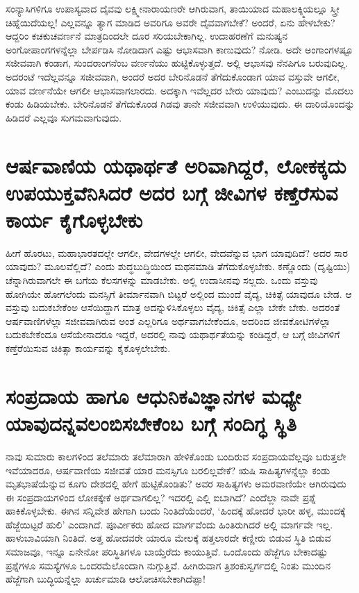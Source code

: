 ಸಂನ್ಯಾಸಿಗಳಿಗೂ ಉಪಾಸ್ಯವಾದ ದೈವವು ಲಕ್ಷ್ಮೀನಾರಾಯಣರೇ ಆಗಿರುವಾಗ, ತಾಯಿಯಾದ ಮಹಾಲಕ್ಶ್ಮಿಯಲ್ಲೂ ಸ್ತ್ರೀ ಚಿಹ್ನೆಯಿದೆಯಲ್ಲ! ಎಲ್ಲವನ್ನೂ ತ್ಯಾಗ ಮಾಡಿದ ಅವರಿಗೂ ಅವರೇ ದೈವವಾಗಬೇಕೆ? ಅಂದರೆ, ಏನು ಹೇಳಬೇಕು? ಆದ್ದರಿಂ ಕಚಕುಚವರ್ಣನೆ ಮಾತ್ರದಿಂದಲೇ ದೂರ ಸರಿಯಬೇಕಾಗಿಲ್ಲ. ಉದಾಹರಣೆಗೆ ಮನುಷ್ಯನ ಅಂಗೋಪಾಂಗಗಳನ್ನೆಲ್ಲಾ ಬೇರ್ಪಡಿಸಿ ನೋಡಿದಾಗ ಎಷ್ಟು ಆಭಾಸವಾಗಿ ಕಾಣುವುದು? ನೋಡಿ. ಅದೇ ಅಂಗಾಂಗಳಷ್ಟೂ ಸಜೀವವಾಗಿ ಕಂಡಾಗ, ಸುಂದರಾಂಗನೆಂಬ ವರ್ಣನೆಯು ಹುಟ್ಟಿಕೊಳ್ಳುತ್ತದೆ. ಅಲ್ಲಿ ಆಭಾಸವು ನೆನಪಿಗೂ ಬರುವುದಿಲ್ಲ. ಅದರಂಟೆ ಇದೆಲ್ಲವನ್ನೂ ಸಜೀವವಾಗಿ, ಅಂದರೆ ಅದರ ಬೇರಿನೊಡನೆ ತೆಗೆದುಕೊಂಡಾಗ ಯಾವ ವಸ್ತುವೇ ಆಗಲೀ, ಯಾವ ವರ್ಣನೆಯೇ ಆಗಲೀ ಆಭಾಸವಾಗಲಾರದು. ಅದಕ್ಕಾಗಿ ಇವೆಲ್ಲದರ ಬೇರು ಯಾವುದು? ಎಂಬುದನ್ನು ಮೊದಲು ಕಂಡು ಹಿಡಿಯಬೇಕು. ಬೇರಿನೊಡನೆ ತೆಗೆದುಕೊಂಡ ಗಿಡವು ತಾನೇ ಸಜೀವವಾಗಿ ಉಳಿಯುವುದು. ಈ ದಾರಿಯೊಂದನ್ನು ಹಿಡಿದರೆ ಎಲ್ಲವೂ ಸುಗಮವಾಗುವುದು.

\section*{ಆರ್ಷವಾಣಿಯ ಯಥಾರ್ಥತೆ ಅರಿವಾಗಿದ್ದರೆ, ಲೋಕಕ್ಕದು ಉಪಯುಕ್ತವೆನಿಸಿದರೆ ಅದರ ಬಗ್ಗೆ ಜೀವಿಗಳ ಕಣ್ತೆರೆಸುವ ಕಾರ್ಯ ಕೈಗೊಳ್ಳಬೇಕು}

ಹೀಗೆ ಹೊರಟು, ಮಹಾಭಾರತದಲ್ಲೇ ಆಗಲೀ, ವೇದಗಳಲ್ಲೇ ಆಗಲೀ, ವೇದವೆನ್ನುವ ಭಾಗ ಯಾವುದಿದೆ? ಅದರ ಸಾರ ಯಾವುದು? ಮೂಲವೆಲ್ಲಿದೆ? ಎಂದು ಶುದ್ಧಬುದ್ಧಿಯಿಂದ ಮಥನಮಾಡಿ ತೆಗೆದುಕೊಳ್ಳಬೇಕು. ಕಣ್ಣೊಂದು (ದೃಷ್ಟಿಯು) ಚೆನ್ನಾಗಿರುವಾಗಲೇ ಈ ಬಗೆಯ ಕೆಲಸಗಳನ್ನು ಮಾಡಬೇಕು. ಅಲ್ಲಿ ಉದಾಸೀನವು ಸಲ್ಲದು. ಒಂದು ವಸ್ತುವು ಹೋಗಿಯೇ ಹೋಗಲೆಂದು ಮನಸ್ಸಿಗೆ ತೀರ್ಮಾನವಾಗಿ ಬಿಟ್ಟರೆ ಅಲ್ಲಿಂದ ಮುಂದೆ ವೈದ್ಯ, ಚಿಕಿತ್ಸೆ ಯಾವುದೂ ಬೇಡ. ಆ ವಸ್ತುವು ಬದುಕಬೇಕೆಂಅ ಆಸೆಯಿದ್ದಾಗ ಮಾತ್ರ ಅದನ್ನುಳಿಸಿಕೊಳ್ಳಲು ವೈದ್ಯ, ಚಿಕಿತ್ಸೆ ಎಲ್ಲಾ ಬೇಕೇ ಬೇಕು. ಅದರಂತೆ ಆರ್ಷವಾಣಿಗಳೆಲ್ಲಾ ಸಜೀವವಾಗಿರುವ ಅಂಶ ಎಲ್ಲರಿಗೂ ಅರ್ಥವಾಗಬೇಕೆಂದೂ, ಅದರಿಂದ ಜೀವಕೋಟಿಗಳೆಲ್ಲಾ ಬದುಕಬೇಕೆಂದೂ ಆಸೆಯೇನಾದರೂ ಇದ್ದರೆ, ಅದರಲ್ಲಿ ನಾವು ಯಥಾರ್ಥತೆಯನ್ನು ಕಂಡಿದ್ದರೆ, ಆ ಬಗ್ಗೆ ಜೀವಿಗಳಿಗೆ ಕಣ್ತೆರೆಯಿಸುವ ಚಿಕಿತ್ಸಾ ಕಾರ್ಯವನ್ನು ಕೈಕೊಳ್ಳಲೇಬೇಕು.

\section*{ಸಂಪ್ರದಾಯ ಹಾಗೂ ಆಧುನಿಕವಿಜ್ಞಾನಗಳ ಮಧ್ಯೇ ಯಾವುದನ್ನವಲಂಬಿಸಬೇಕೆಂಬ ಬಗ್ಗೆ ಸಂದಿಗ್ಧ ಸ್ಥಿತಿ}

ನಾವು ಸುಮಾರು ಕಾಲಗಳಿಂದ ತಲೆಮಾರು ತಲೆಮಾರಾಗಿ ಹೇಳಿಕೊಂಡು ಬಂದಿರುವ ಸಂಪ್ರದಾಯವೆಲ್ಲವೂ ಬರುತ್ತಲೇ ಇವೆಯಾದರೂ, ಆರ್ಷವಾಣಿಯ ಸಜೀವತೆ ಯಾರ ಮನಸ್ಸಿಗೂ ಬರಲಿಲ್ಲವೇಕೆ? ಋಷಿ ಸಾಹಿತ್ಯಗಳನ್ನೆಲ್ಲಾ ಕಂಡು ಮೃತಭಾಷೆಯೆನ್ನುವ ಕೂಗು ದೇಶದಲ್ಲಿ ಹೇಗೆ ಹುಟ್ಟಿಕೊಂಡಿತು? ಅವರ ಸಾಹಿತ್ಯಗಳು ಅಮರವಾಣಿಯೇ ಆಗಿರುವುದು ಈ ಸಂಪ್ರದಾಯಗಳಿಂದ ಲೋಕಕ್ಕೇಕೆ ಅರ್ಥವಾಗಲಿಲ್ಲ? ಇದರಲ್ಲಿ ಎಲ್ಲಿ ಐಬಾಗಿದೆ? ಎಂದೆಲ್ಲಾ ನಾವೇ ಪ್ರಶ್ನೆ ಹಾಕಿಕೊಳ್ಳಬೇಕು. ಈಗಿನ ಸನ್ನಿವೇಶ ಹೇಗಾಗಿ ಬಂದು ನಿಂತಿದೆಯೆಂದರೆ, `ಹಿಂದಕ್ಕೆ ಹೋದರೆ ಭಾರೀ ಹಳ್ಳ, ಮುಂದಕ್ಕೆ ಹೆಜ್ಜೆಯಿಟ್ಟರೆ ಹುಲಿ'  ಎಂದಾಗಿದೆ. ಪೂರ್ವೀಕರು ಹೋದ ಮಾರ್ಗವೆಂದು ಹಿಂತಿರುಗಿದರೆ ಅಲ್ಲಿ ಮಾರ್ಗವೇ ಇಲ್ಲ. ಹಾಳುಬಾವಿಯಾಗಿ ನಿಂತಿದೆ. ಅತ್ತ ಹೋದವರೇ ಯಾರೂ ಮೇಲಕ್ಕೆ ಹತ್ತಲಾರದೇ ಕಣ್ಣೀರು ಬಿಡುವ ಸ್ಥಿತಿ ಬಿಡುವ ಸಮಾಜವೂ, ಇನ್ನೂ ಏನೇನೋ ಪರಿಸ್ಥಿತಿಗಳೂ ಬಾಯ್ತೆರೆದು ಕಾಯುತ್ತಿವೆ. ಒಂದೊಂದು ಹೆಜ್ಜೆಗೂ ಬೇಕಾದಷ್ಟು ಪ್ರಶ್ನೆಗಳೂ ಸಮಸ್ಯೆಗಳೂ ಒಂದರಮೆಲೊಂದಾಗಿ ನುಗ್ಗುತ್ತಿವೆ. ಹೀಗಿರುವಾಗ ತ್ರಿಶಂಕುಸ್ವರ್ಗದಲ್ಲಿ ನಿಂತು ಮುಂದಿನ ಹೆಜ್ಜೆಗಾಗಿ ಬುದ್ಧಿಯನ್ನೆಲ್ಲಾ ಖರ್ಚುಮಾಡಿ ಆಲೋಚಿಸಬೇಕಾಗಿದೆಪ್ಪಾ!

